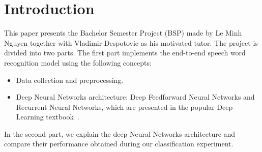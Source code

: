
\section{Introduction}

This paper presents the Bachelor Semester Project (BSP) made by Le Minh Nguyen
together with Vladimir Despotovic as his motivated tutor. The project is divided
into two parts. The first part implements the end-to-end speech word recognition
model using the following concepts:

\begin{itemize}
\item Data collection and preprocessing.
\item Deep Neural Networks architecture: Deep Feedforward Neural Networks and
  Recurrent Neural Networks, which are presented in the popular Deep Learning
  textbook~\cite{Goodfellow-et-al-2016}.
\end{itemize}

In the second part, we explain the deep Neural Networks architecture and compare their
performance obtained during our classification experiment.\\
